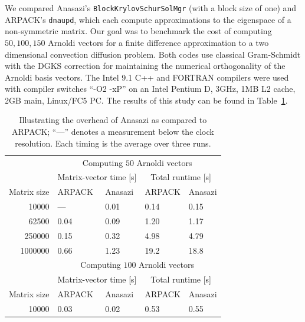 \documentclass[acmtoms,acmnow]{acmtrans2m}
\newcommand{\aspace}[1]{\texttt{#1}}
\begin{document}
We compared Anasazi's \aspace{BlockKrylovSchurSolMgr} (with a block size
of one) and ARPACK's \aspace{dnaupd}, which each compute approximations to the
eigenspace of a non-symmetric matrix. Our goal was to benchmark the
cost of computing $50, 100, 150$ Arnoldi vectors for a finite
difference approximation to a two dimensional convection diffusion
problem. Both codes use classical Gram-Schmidt with the DGKS \cite{dgks:76} 
correction for maintaining the numerical orthogonality of the Arnoldi basis
vectors.  The Intel 9.1 C++ and FORTRAN compilers were used with
compiler switches ``-O2 -xP'' on an Intel Pentium D, 3GHz, 1MB L2
cache, 2GB main, Linux/FC5 PC.  The results of this study can be found
in Table~\ref{table:timings}.

\begin{table}
\caption{Illustrating the overhead of Anasazi as compared to ARPACK; ``---'' denotes a measurement
below the clock resolution. Each timing is the average over three runs.}
\label{table:timings}
\begin{center}
\begin{tabular}{r|ll|ll|}
       \cline{2-5} %
        & \multicolumn{4}{c|}{Computing $50$ Arnoldi vectors} \\ \cline{2-5}
        & \multicolumn{2}{c|}{Matrix-vector time [s]} &
       \multicolumn{2}{c|}{Total runtime [s]}\\ \hline
       Matrix size & ARPACK & Anasazi & ARPACK & Anasazi \\ \hline %
       10000 & --- & 0.01 & 0.14 & 0.15 \\
       62500 & 0.04 & 0.09 & 1.20 & 1.17 \\
       250000 & 0.15 & 0.32 & 4.98 & 4.79 \\
       1000000 & 0.66 & 1.23 & 19.2 & 18.8 \\
       \hline
        & \multicolumn{4}{c|}{Computing $100$ Arnoldi vectors} \\ \cline{2-5}
        & \multicolumn{2}{c|}{Matrix-vector time [s]} &
       \multicolumn{2}{c|}{Total runtime [s]}\\ \hline
       Matrix size & ARPACK & Anasazi & ARPACK & Anasazi \\ \hline %
       10000 & 0.03 & 0.02 & 0.53 & 0.55 \\

\end{tabular}
\end{center}
\end{table}
\end{document}
